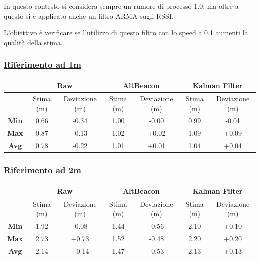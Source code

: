 In questo contesto si considera sempre un rumore di processo 1.0,  ma oltre a questo si è applicato anche un filtro ARMA sugli RSSI.

L'obiettivo è verificare se l'utilizzo di questo filtro con lo speed a 0.1 aumenti la qualità della stima.

\subsubsection{\underline{Riferimento ad 1m}}
\begin{center}
	\begin{tabular}{|c|c|c|c|c|c|c|}
		\hline 
		& \multicolumn{2}{|c|}{\textbf{Raw}} &\multicolumn{2}{|c|}{\textbf{AltBeacon}} &\multicolumn{2}{|c|}{\textbf{Kalman Filter}}\\ 
		\hline 
		& Stima (m) & Deviazione (m) & Stima (m) & Deviazione (m) & Stima (m)& Deviazione (m)\\ 
		\hline 
		\textbf{Min} & 0.66	& -0.34 & 1.00	& -0.00 & 0.99	& -0.01 \\ 
		\hline 
		\textbf{Max} & 0.87	& -0.13 & 1.02	& +0.02 & 1.09	& +0.09	\\ 
		\hline 
		\textbf{Avg} & 0.78 	& -0.22 & 1.01 	& +0.01 & 1.04 	& +0.04	\\ 
		\hline 
	\end{tabular}
\end{center}

\subsubsection{\underline{Riferimento ad 2m}}
\begin{center}
	\begin{tabular}{|c|c|c|c|c|c|c|}
		\hline 
		& \multicolumn{2}{|c|}{\textbf{Raw}} &\multicolumn{2}{|c|}{\textbf{AltBeacon}} &\multicolumn{2}{|c|}{\textbf{Kalman Filter}}\\ 
		\hline 
		& Stima (m) & Deviazione (m) & Stima (m) & Deviazione (m) & Stima (m)& Deviazione (m)\\ 
		\hline 
		\textbf{Min} & 1.92	& -0.08 & 1.44	& -0.56 & 2.10	& +0.10 \\ 
		\hline 
		\textbf{Max} & 2.73	& +0.73 & 1.52	& -0.48 & 2.20	& +0.20	\\ 
		\hline 
		\textbf{Avg} & 2.14	& +0.14 & 1.47 	& -0.53 & 2.13 	& +0.13	\\ 
		\hline 
	\end{tabular}
\end{center}

